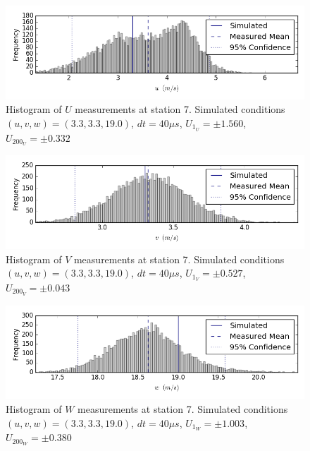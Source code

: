 \begin{figure}[H]
\centering
\includegraphics[width=6in]{figs/Ely_May28th07002/uncertainty_Ely_May28th07002_U}
\caption{Histogram of $U$ measurements at station 7. Simulated conditions $(u,v,w)=(3.3, 3.3, 19.0)$, $dt=40 \mu s$, $U_1_U=\pm 1.560$, $U_200_U=\pm 0.332$}
\label{fig:uncertainty_Ely_May28th07002_U}
\end{figure}


\begin{figure}[H]
\centering
\includegraphics[width=6in]{figs/Ely_May28th07002/uncertainty_Ely_May28th07002_V}
\caption{Histogram of $V$ measurements at station 7. Simulated conditions $(u,v,w)=(3.3, 3.3, 19.0)$, $dt=40 \mu s$, $U_1_V=\pm 0.527$, $U_200_V=\pm 0.043$}
\label{fig:uncertainty_Ely_May28th07002_V}
\end{figure}


\begin{figure}[H]
\centering
\includegraphics[width=6in]{figs/Ely_May28th07002/uncertainty_Ely_May28th07002_W}
\caption{Histogram of $W$ measurements at station 7. Simulated conditions $(u,v,w)=(3.3, 3.3, 19.0)$, $dt=40 \mu s$, $U_1_W=\pm 1.003$, $U_200_W=\pm 0.380$}
\label{fig:uncertainty_Ely_May28th07002_W}
\end{figure}



